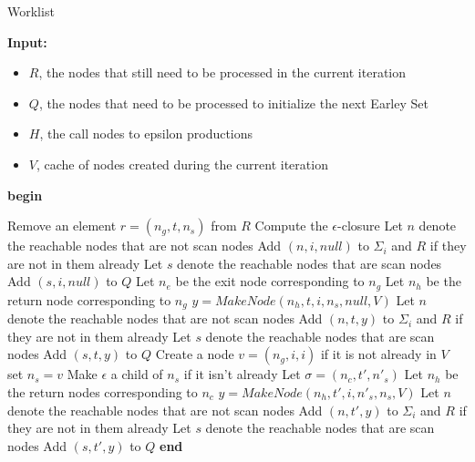 \documentclass{sigplanconf}
\begin{document}
\begin{algorithm}[!h]\label{alg:W}
	\caption{Worklist}
	\textbf{Input:} 
	\begin{itemize}
	\item[] $R$, the nodes that still need to be processed in the current iteration
	\item[] $Q$, the nodes that need to be processed to initialize the next Earley Set 
	\item[] $H$, the call nodes to epsilon productions
	\item[] $V$, cache of nodes created during the current iteration
	\end{itemize}
	\textbf{begin}
	
	{
	Remove an element $r=(n_g,t,n_s)$ from $R$ \;
	{
	Compute the $\epsilon$-closure \;
	\quad Let $n$ denote the reachable nodes that are not scan nodes \;
	\quad Add $(n,i,null)$ to $\Sigma_i$ and $R$ if they are not in them already \;
	\quad Let $s$ denote the reachable nodes that are scan nodes \; 
	\quad Add $(s,i,null)$ to $Q$ \;
    Let $n_e$ be the exit node corresponding to $n_g$ \;
    {
    Let $n_h$ be the return node corresponding to $n_g$ \;
	$y=MakeNode(n_h,t,i,n_s,null,V)$ \; 
	Let $n$ denote the reachable nodes that are not scan nodes \;
    Add $(n,t,y)$ to $\Sigma_i$ and $R$ if they are not in them already \;
    Let $s$ denote the reachable nodes that are scan nodes \;
    Add $(s,t,y)$ to $Q$ \;
    }
	}
	{
	{
	Create a node $v=(n_g,i,i)$ if it is not already in $V$ \;
	set $n_s = v$ \;
	Make $\epsilon$ a child of $n_s$ if it isn't already \;
	}
	{
	Let $\sigma = (n_c,t',n'_s)$ \;
	Let $n_h$ be the return nodes corresponding to $n_c$ \;
    $y=MakeNode(n_h,t',i,n'_s,n_s,V)$ \;
    Let $n$ denote the reachable nodes that are not scan nodes \;
    Add $(n,t',y)$ to $\Sigma_i$ and $R$ if they are not in them already \; 
    Let $s$ denote the reachable nodes that are scan nodes \;
    Add $(s,t',y)$ to $Q$ \;
	}
	}
	}
	\textbf{end}
\end{algorithm}
\end{document}
